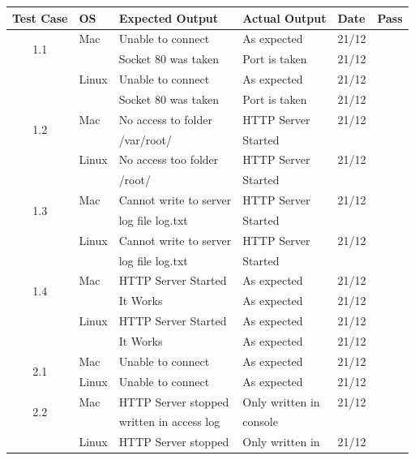 \documentclass[a4paper, 12pt]{article}
\newcommand{\cmark}{\ding{51}}%
\newcommand{\xmark}{\ding{55}}%
\begin{document}
\begin{tabular}{| c | l | l | l | l | c |}
\hline

Test Case 		& OS		& Expected Output		& Actual Output		& Date		& Pass		\\ \hline
\multirow{2}{*}{1.1}    & Mac		& Unable to connect		& As expected		& 21/12	        &\cmark		\\ 
			&		& Socket 80 was taken		& Port is taken		& 21/12		&\xmark		\\ 
\cline{2-6}		& Linux		& Unable to connect		& As expected		& 21/12		& \cmark	\\
			&		& Socket 80 was taken		& Port is taken		& 21/12		& \xmark	\\ \hline
\multirow{2}{*}{1.2}	& Mac		& No access to folder		& HTTP Server 		& 21/12		& \xmark	\\ 
			&		& /var/root/			& Started		&		&		\\
\cline{2-6}		& Linux		& No access too folder		& HTTP Server 		& 21/12		& \xmark	\\ 
			&		& /root/			& Started		&		&		\\ \hline
\multirow{2}{*}{1.3}	& Mac		& Cannot write to server	& HTTP Server 		& 21/12		& \xmark	\\ 
			&		& log file log.txt		& Started		&		&		\\
\cline{2-6}		& Linux		& Cannot write to server	& HTTP Server		& 21/12		& \xmark	\\ 
			&		& log file log.txt		& Started		&		&		\\ \hline
\multirow{2}{*}{1.4}	& Mac		& HTTP Server Started		& As expected		& 21/12		& \cmark 	\\ 
			&		& It Works			& As expected		& 21/12		& \cmark 	\\
\cline{2-6}		& Linux		& HTTP Server Started		& As expected		& 21/12		& \cmark	\\ 
			&		& It Works			& As expected		& 21/12		& \cmark 	\\ \hline
\multirow{2}{*}{2.1}	& Mac		& Unable to connect		& As expected		& 21/12		& \cmark	\\
\cline{2-6}		& Linux		& Unable to connect		& As expected		& 21/12		& \cmark	\\ \hline
\multirow{2}{*}{2.2}	& Mac		& HTTP Server stopped		& Only written in	& 21/12		& \xmark	\\
			&		& written in access log		& console		& 		& 		\\
\cline{2-6}		& Linux		& HTTP Server stopped		& Only written in	& 21/12		& \xmark	\\ 

\end{tabular}
\end{document}
